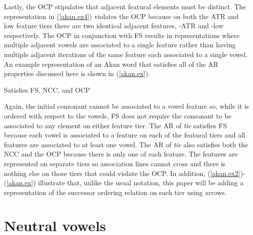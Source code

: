 \documentclass[floatsintext,man]{apa6}
\theoremstyle{definition}
\theoremstyle{definition}
\theoremstyle{definition}
\theoremstyle{remark}
\begin{document}
Lastly, the OCP stipulates that adjacent featural elements must be
distinct. The representation in (\ref{akan.ex4}) violates the OCP
because on both the ATR and low feature tiers there are two identical
adjacent features, -ATR and -low respectively. The OCP in conjunction
with FS results in representations where multiple adjacent vowels are
associated to a single feature rather than having multiple adjacent
iterations of the same feature each associated to a single vowel. An
example representation of an Akan word that satisfies all of the AR
properties discussed here is shown in (\ref{akan.ex}).

\begin{exe}
\ex \label{akan.ex} Satisfies FS, NCC, and OCP
\end{exe}

Again, the initial consonant cannot be associated to a vowel feature so,
while it is ordered with respect to the vowels, FS does not require the
consonant to be associated to any element on either feature tier. The AR
of \emph{tie} satisfies FS because each vowel is associated to a feature
on each of the featural tiers and all features are associated to at
least one vowel. The AR of \emph{tie} also satisfies both the NCC and
the OCP because there is only one of each feature. The features are
represented on separate tiers so association lines cannot cross and
there is nothing else on those tiers that could violate the OCP. In
addition, (\ref{akan.ex2})-(\ref{akan.ex}) illustrate that, unlike the
usual notation, this paper will be adding a representation of the
successor ordering relation on each tier using arrows.

\section{Neutral vowels}\label{neutral-vowels}
\end{document}

